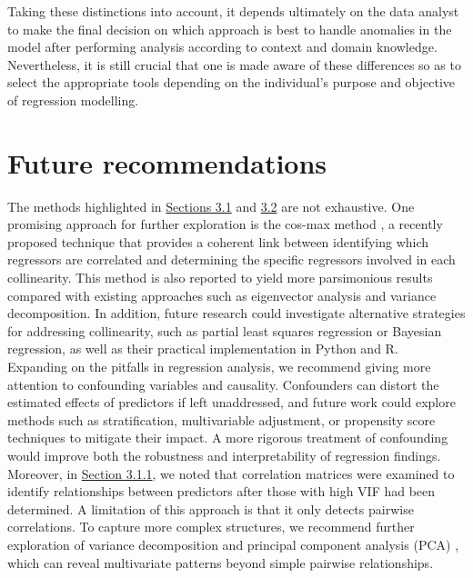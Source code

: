 \documentclass[12pt]{article}
\begin{document}
	Taking these distinctions into account, it depends ultimately on the data analyst to make the final decision on which approach is best to handle anomalies in the model after performing analysis according to context and domain knowledge. Nevertheless, it is still crucial that one is made aware of these differences so as to select the appropriate tools depending on the individual's purpose and objective of regression modelling. 
	
	\section{Future recommendations\label{sec:future-rec}}
	
	The methods highlighted in \hyperref[sec:3.1]{Sections 3.1} and \hyperref[sec:3.2]{3.2} are not exhaustive. One promising approach for further exploration is the cos-max method \cite{Shabuz2024}, a recently proposed technique that provides a coherent link between identifying which regressors are correlated and determining the specific regressors involved in each collinearity. This method is also reported to yield more parsimonious results compared with existing approaches such as eigenvector analysis and variance decomposition. In addition, future research could investigate alternative strategies for addressing collinearity, such as partial least squares regression or Bayesian regression, as well as their practical implementation in Python and R.\\
	
	Expanding on the pitfalls in regression analysis, we recommend giving more attention to confounding variables and causality. Confounders can distort the estimated effects of predictors if left unaddressed, and future work could explore methods such as stratification, multivariable adjustment, or propensity score techniques to mitigate their impact. A more rigorous treatment of confounding would improve both the robustness and interpretability of regression findings.\\
	
	Moreover, in \hyperref[sec:311]{Section 3.1.1}, we noted that correlation matrices were examined to identify relationships between predictors after those with high VIF had been determined. A limitation of this approach is that it only detects pairwise correlations. To capture more complex structures, we recommend further exploration of variance decomposition and principal component analysis (PCA) \cite{Johnston2018}, which can reveal multivariate patterns beyond simple pairwise relationships.
	
\end{document}
